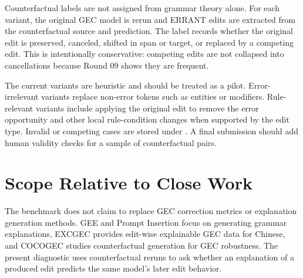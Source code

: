 \documentclass[letterpaper]{article}
\begin{document}
Counterfactual labels are not assigned from grammar theory alone. For each variant, the original GEC model is rerun and ERRANT edits are extracted from the counterfactual source and prediction. The label records whether the original edit is preserved, canceled, shifted in span or target, or replaced by a competing edit. This is intentionally conservative: competing edits are not collapsed into cancellations because Round 09 shows they are frequent.

The current variants are heuristic and should be treated as a pilot. Error-irrelevant variants replace non-error tokens such as entities or modifiers. Rule-relevant variants include applying the original edit to remove the error opportunity and other local rule-condition changes when supported by the edit type. Invalid or competing cases are stored under . A final submission should add human validity checks for a sample of counterfactual pairs.

\section{Scope Relative to Close Work}

The benchmark does not claim to replace GEC correction metrics or explanation generation methods. GEE and Prompt Insertion focus on generating grammar explanations, EXCGEC provides edit-wise explainable GEC data for Chinese, and COCOGEC studies counterfactual generation for GEC robustness. The present diagnostic uses counterfactual reruns to ask whether an explanation of a produced edit predicts the same model's later edit behavior.
\end{document}
